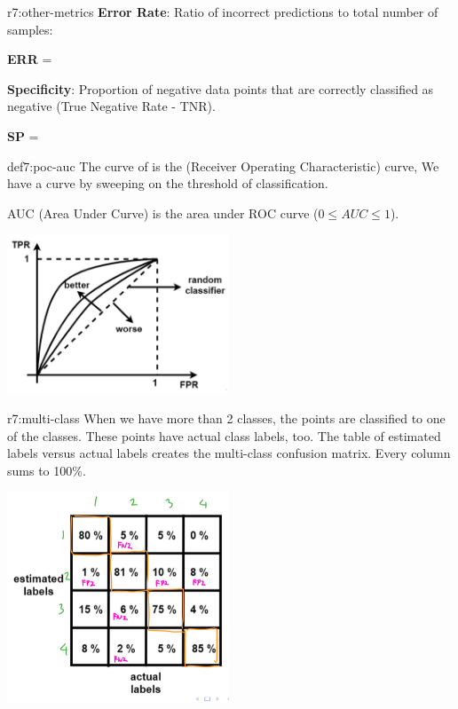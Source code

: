 \documentclass{tron}
\begin{document}
\begin{remark}{r7:other-metrics}
	\textbf{Error Rate}: Ratio of incorrect predictions to total number of samples:
	\begin{eqn}{}
		\textbf{ERR} = 	 
	\end{eqn}
	\textbf{Specificity}: Proportion of negative data points that are correctly classified as negative (True Negative Rate - TNR).
	\begin{eqn}[Specificity]{}
		\textbf{SP} = 	 
	\end{eqn}
\end{remark}

\begin{definition}{def7:poc-auc}
	The curve of  is the  (Receiver Operating Characteristic) curve, We have a curve by sweeping on the threshold of classification.
	
	AUC (Area Under Curve) is the area under ROC curve ($0 \leq AUC \leq 1$).
	
	\includegraphics[width = 250px]{Figs/Lec7/roc-curve}
\end{definition}

\begin{remark}{r7:multi-class}
	When we have more than 2 classes, the points are classified to one of the classes. These points have actual class labels, too. The table of estimated labels versus actual labels creates the multi-class confusion matrix. Every column sums to 100\%. 
	
	\includegraphics[width = 250px]{Figs/Lec7/multi-class-conf-mat}
\end{remark}
\end{document}
